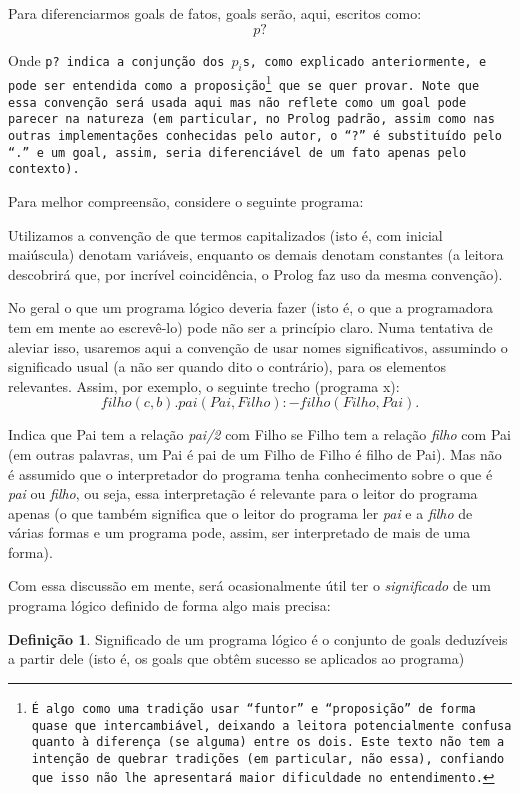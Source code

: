 \documentclass{article}
\theoremstyle{definition}
\newtheorem{definition}{Definição}[section]
\theoremstyle{remark}
\begin{document}
Para diferenciarmos goals de fatos, goals serão, aqui, escritos como:
\[
  p?
\]

Onde \tt{p?} indica a conjunção dos $p_i$s, como explicado anteriormente, e pode ser entendida como a proposição\footnote{É algo como uma tradição usar ``funtor'' e ``proposição'' de forma quase que intercambiável, deixando a leitora potencialmente confusa quanto à diferença (se alguma) entre os dois. Este texto não tem a intenção de quebrar tradições (em particular, não essa), confiando que isso não lhe apresentará maior dificuldade no entendimento.} que se quer provar. Note que essa convenção será usada aqui mas não reflete como um goal pode parecer na natureza (em particular, no
Prolog padrão, assim como nas outras implementações conhecidas pelo autor, o ``\textit{?}'' é substituído pelo ``.'' e um goal, assim, seria diferenciável de um fato apenas pelo contexto).

Para melhor compreensão, considere o seguinte programa:



Utilizamos a convenção de que termos capitalizados (isto é, com inicial maiúscula) denotam variáveis, enquanto os demais denotam constantes (a leitora descobrirá que, por incrível coincidência, o Prolog faz uso da mesma convenção).

No geral o que um programa lógico deveria fazer (isto é, o que a programadora tem em mente ao escrevê-lo) pode não ser a princípio claro. Numa tentativa de aleviar isso, usaremos aqui a convenção de usar nomes significativos, assumindo o significado usual (a não ser quando dito o contrário), para os elementos relevantes. Assim, por exemplo, o seguinte trecho (programa x):
\[
  filho(c,b).
  pai(Pai, Filho) :- filho(Filho, Pai).
\]

Indica que Pai tem a relação \textit{pai/2} com Filho se Filho tem a relação \textit{filho} com Pai (em outras palavras, um Pai é pai de um Filho de Filho é filho de Pai). Mas não é assumido que o interpretador do programa tenha conhecimento sobre o que é \textit{pai} ou \textit{filho}, ou seja, essa interpretação é relevante para o leitor do programa apenas (o que também significa que o leitor do programa ler \textit{pai} e a \textit{filho} de várias formas e um programa pode, assim,
ser interpretado de mais de uma forma).

Com essa discussão em mente, será ocasionalmente útil ter o \textit{significado} de um programa lógico definido de forma algo mais precisa:

  \theoremstyle{definition}
  \begin{definition}{Significado}
    de um programa lógico é o conjunto de goals deduzíveis a partir dele (isto é, os goals que obtêm sucesso se aplicados ao programa)
  \end{definition}
\end{document}
